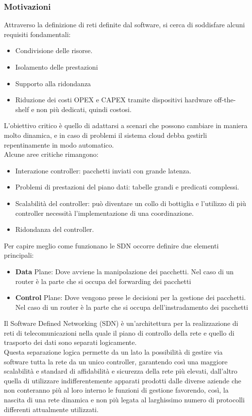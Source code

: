 \documentclass{article}
\begin{document}
		\subsubsection{Motivazioni}
		Attraverso la definizione di reti definite dal software, si cerca di soddisfare alcuni requisiti fondamentali:
		\begin{itemize}
		    \item Condivisione delle risorse.
		    \item Isolamento delle prestazioni 
		    \item Supporto alla ridondanza
		    \item Riduzione dei costi OPEX e CAPEX tramite dispositivi hardware off-the-shelf e non più dedicati, quindi costosi.
		\end{itemize}
		L'obiettivo critico è quello di adattarsi a scenari che possono cambiare in maniera molto dinamica, e in caso di problemi il sistema cloud debba gestirli repentinamente in modo automatico.\\
		Alcune aree critiche rimangono:
		\begin{itemize}
		    \item Interazione controller: pacchetti inviati con grande latenza.
		    \item Problemi di prestazioni del piano dati: tabelle grandi e predicati complessi.
		    \item Scalabilità del controller: può diventare un collo di bottiglia e l'utilizzo di più controller necessità l'implementazione di una coordinazione.
		    \item Ridondanza del controller.
		\end{itemize}
		Per capire meglio come funzionano le SDN occorre definire due elementi principali:
		\begin{itemize}
		\item \textbf{Data} Plane: Dove avviene la manipolazione dei pacchetti. Nel caso di un router è la parte che si occupa del forwarding dei pacchetti
		\item \textbf{Control} Plane: Dove vengono prese le decisioni per la gestione dei pacchetti. Nel caso di un router è la parte che si occupa dell'instradamento dei pacchetti
		\end{itemize}
		Il Software Defined Networking (SDN) è un’architettura per la realizzazione di reti di telecomunicazioni nella quale il piano di controllo della rete e quello di trasporto dei dati sono separati logicamente.\\
		Questa separazione logica permette da un lato la possibilità di gestire via software tutta la rete da un unico controller, garantendo così una maggiore scalabilità e standard di affidabilità e sicurezza della rete più elevati, dall’altro quella di utilizzare indifferentemente apparati prodotti dalle diverse aziende che non conteranno più al loro interno le funzioni di gestione favorendo, così, la nascita di una rete dinamica e non più legata al larghissimo numero di protocolli differenti attualmente utilizzati.\\
		
\end{document}
